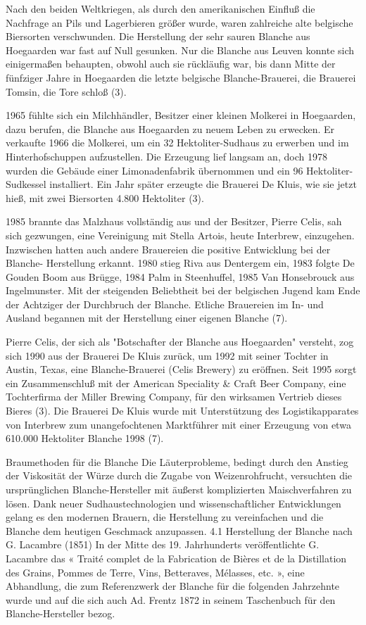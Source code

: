 \documentclass[a4paper,parskip=half]{scrartcl}
\begin{document}
Nach den beiden Weltkriegen, als durch den amerikanischen Einfluß die Nachfrage
an Pils und Lagerbieren größer wurde, waren zahlreiche alte belgische Biersorten
verschwunden. Die Herstellung der sehr sauren Blanche aus Hoegaarden war fast
auf Null gesunken. Nur die Blanche aus Leuven konnte sich einigermaßen
behaupten, obwohl auch sie rückläufig war, bis dann Mitte der fünfziger Jahre in
Hoegaarden die letzte belgische Blanche-Brauerei, die Brauerei Tomsin, die Tore
schloß (3).

1965 fühlte sich ein Milchhändler, Besitzer einer kleinen Molkerei in Hoegaarden,
dazu berufen, die Blanche aus Hoegaarden zu neuem Leben zu erwecken. Er
verkaufte 1966 die Molkerei, um ein 32 Hektoliter-Sudhaus zu erwerben und im
Hinterhofschuppen aufzustellen. Die Erzeugung lief langsam an, doch 1978 wurden
die Gebäude einer Limonadenfabrik übernommen und ein 96 Hektoliter-Sudkessel
installiert. Ein Jahr später erzeugte die Brauerei De Kluis, wie sie jetzt hieß, mit zwei
Biersorten 4.800 Hektoliter (3).

1985 brannte das Malzhaus vollständig aus und der Besitzer, Pierre Celis, sah sich
gezwungen, eine Vereinigung mit Stella Artois, heute Interbrew, einzugehen.
Inzwischen hatten auch andere Brauereien die positive Entwicklung bei der Blanche-
Herstellung erkannt. 1980 stieg Riva aus Dentergem ein, 1983 folgte De Gouden
Boom aus Brügge, 1984 Palm in Steenhuffel, 1985 Van Honsebrouck aus
Ingelmunster. Mit der steigenden Beliebtheit bei der belgischen Jugend kam Ende
der Achtziger der Durchbruch der Blanche. Etliche Brauereien im In- und Ausland
begannen mit der Herstellung einer eigenen Blanche (7).

\parencite[6]{Strottner1999}

Pierre Celis, der sich als "Botschafter der Blanche aus Hoegaarden" versteht, zog
sich 1990 aus der Brauerei De Kluis zurück, um 1992 mit seiner Tochter in Austin,
Texas, eine Blanche-Brauerei (Celis Brewery) zu eröffnen. Seit 1995 sorgt ein
Zusammenschluß mit der American Speciality \& Craft Beer Company, eine
Tochterfirma der Miller Brewing Company, für den wirksamen Vertrieb dieses
Bieres (3).
Die Brauerei De Kluis wurde mit Unterstützung des Logistikapparates von Interbrew
zum unangefochtenen Marktführer mit einer Erzeugung von etwa 610.000 Hektoliter
Blanche 1998 (7).

\parencite[9]{Strottner1999}

Braumethoden für die Blanche
Die Läuterprobleme, bedingt durch den Anstieg der Viskosität der Würze durch die
Zugabe von Weizenrohfrucht, versuchten die ursprünglichen Blanche-Hersteller mit
äußerst komplizierten Maischverfahren zu lösen.
Dank neuer Sudhaustechnologien und wissenschaftlicher Entwicklungen gelang es
den modernen Brauern, die Herstellung zu vereinfachen und die Blanche dem
heutigen Geschmack anzupassen.
4.1
Herstellung der Blanche nach G. Lacambre (1851)
In der Mitte des 19. Jahrhunderts veröffentlichte G. Lacambre das « Traité complet
de la Fabrication de Bières et de la Distillation des Grains, Pommes de Terre, Vins,
Betteraves, Mélasses, etc. », eine Abhandlung, die zum Referenzwerk der Blanche
für die folgenden Jahrzehnte wurde und auf die sich auch Ad. Frentz 1872 in seinem
Taschenbuch für den Blanche-Hersteller bezog.
\end{document}
